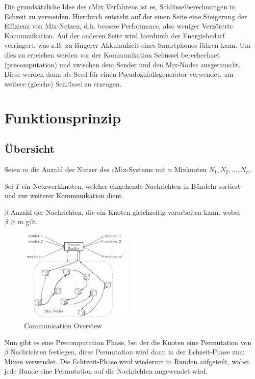 \documentclass[
    fontsize=12pt,
    headings=small,
    parskip=half,           %
    bibliography=totoc,
    numbers=noenddot,       %
    open=any,               %
    ]{scrreprt}
\begin{document}
Die grundsätzliche Idee des cMix Verfahrens ist es, Schlüsselberechnungen in Echzeit zu vermeiden. Hierdurch entsteht auf 
der einen Seite eine Steigerung der Effizienz von Mix-Netzen, d.h. bessere Performance, also weniger Verzörerte Kommunikation. Auf der anderen Seite wird hierdurch
 der Energiebedarf verringert, was z.B. zu längerer Akkulaufzeit eines Smartphones führen kann.
 Um dies zu erreichen werden vor der Kommunikation Schüssel berechechnet (precomputation) und zwischen dem Sender und den Mix-Nodes ausgetauscht.
 Diese werden dann als Seed für einen Pseudozufallsgenerator verwendet, um weitere (gleiche) Schlüssel zu erzeugen.

\section{Funktionsprinzip}
\subsection{Übersicht}
Seien $m$ die Anzahl der Nutzer des cMix-Systems mit $n$ Mixknoten $N_1, N_2, ... ,  N_n$. 

Sei $T$ ein Netzwerkknoten, welcher eingehende Nachrichten in Bündeln sortiert und zur weiterer Kommunikation dient.

$\beta$ Anzahl der Nachrichten, die ein Knoten gleichzeitig verarbeiten kann, wobei $\beta \geq m$ gilt.
\begin{figure}[h]
 \caption{Communication Overview}
\includegraphics[width=0.5\textwidth]{Bilder/commu_model.png}
\end{figure}


Nun gibt es eine Precomputation Phase, bei der die Knoten eine Permutation von $\beta$ Nachrichten festlegen, diese Permutation wird dann in der Echzeit-Phase zum Mixen verwendet.
Die Echtzeit-Phase wird wiederum in Runden aufgeteilt, wobei jede Runde eine Permutation auf die Nachrichten angewendet wird. \cite{ribarski2012mixnets}
\end{document}
